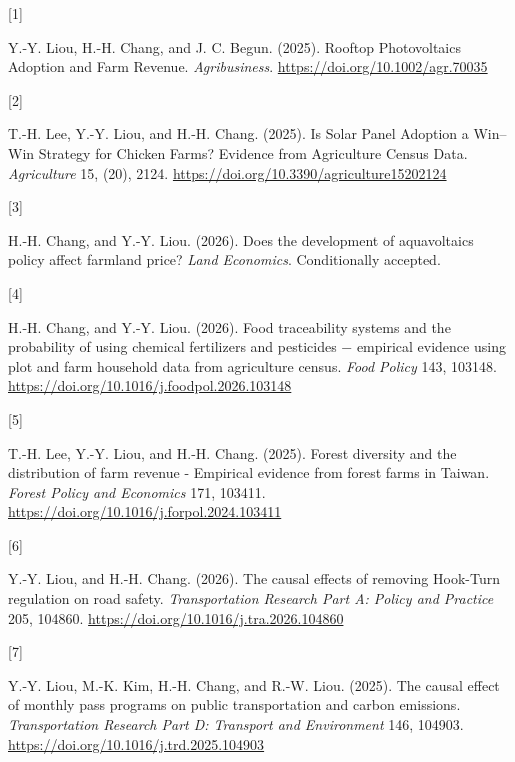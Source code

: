 \documentclass[
  11pt,
]{article}
\newlength{\cslhangindent}
\newlength{\csllabelwidth}
\newenvironment{CSLReferences}[2] %
 {\begin{list}{}{%
  \setlength{\itemindent}{0pt}
  \setlength{\leftmargin}{0pt}
  \setlength{\parsep}{0pt}
  \ifodd #1
   \setlength{\leftmargin}{\cslhangindent}
   \setlength{\itemindent}{-1\cslhangindent}
  \fi
  \setlength{\itemsep}{#2\baselineskip}}}
 {\end{list}}
\newcommand{\CSLLeftMargin}[1]{\parbox[t]{\csllabelwidth}{\strut#1\strut}}
\newcommand{\CSLRightInline}[1]{\parbox[t]{\linewidth - \csllabelwidth}{\strut#1\strut}}
\begin{document}
\protect{}\label{refs}
\begin{CSLReferences}{0}{0}
\CSLLeftMargin{{[}1{]} }%
\CSLRightInline{Y.-Y. Liou, H.-H. Chang, and J. C. Begun. (2025).
{Rooftop Photovoltaics Adoption and Farm Revenue}. \emph{Agribusiness}.
\url{https://doi.org/10.1002/agr.70035}}

\CSLLeftMargin{{[}2{]} }%
\CSLRightInline{T.-H. Lee, Y.-Y. Liou, and H.-H. Chang. (2025). {Is
Solar Panel Adoption a Win--Win Strategy for Chicken Farms? Evidence
from Agriculture Census Data}. \emph{Agriculture} 15, (20), 2124.
\url{https://doi.org/10.3390/agriculture15202124}}

\CSLLeftMargin{{[}3{]} }%
\CSLRightInline{H.-H. Chang, and Y.-Y. Liou. (2026). Does the
development of aquavoltaics policy affect farmland price? \emph{Land
Economics}. Conditionally accepted.}

\CSLLeftMargin{{[}4{]} }%
\CSLRightInline{H.-H. Chang, and Y.-Y. Liou. (2026). Food traceability
systems and the probability of using chemical fertilizers and pesticides
− empirical evidence using plot and farm household data from agriculture
census. \emph{Food Policy} 143, 103148.
\url{https://doi.org/10.1016/j.foodpol.2026.103148}}

\CSLLeftMargin{{[}5{]} }%
\CSLRightInline{T.-H. Lee, Y.-Y. Liou, and H.-H. Chang. (2025). Forest
diversity and the distribution of farm revenue - {E}mpirical evidence
from forest farms in {T}aiwan. \emph{Forest Policy and Economics} 171,
103411. \url{https://doi.org/10.1016/j.forpol.2024.103411}}

\CSLLeftMargin{{[}6{]} }%
\CSLRightInline{Y.-Y. Liou, and H.-H. Chang. (2026). The causal effects
of removing {Hook-Turn} regulation on road safety. \emph{Transportation
Research Part A: Policy and Practice} 205, 104860.
\url{https://doi.org/10.1016/j.tra.2026.104860}}

\CSLLeftMargin{{[}7{]} }%
\CSLRightInline{Y.-Y. Liou, M.-K. Kim, H.-H. Chang, and R.-W. Liou.
(2025). The causal effect of monthly pass programs on public
transportation and carbon emissions. \emph{Transportation Research Part
D: Transport and Environment} 146, 104903.
\url{https://doi.org/10.1016/j.trd.2025.104903}}


\end{CSLReferences}
\end{document}
